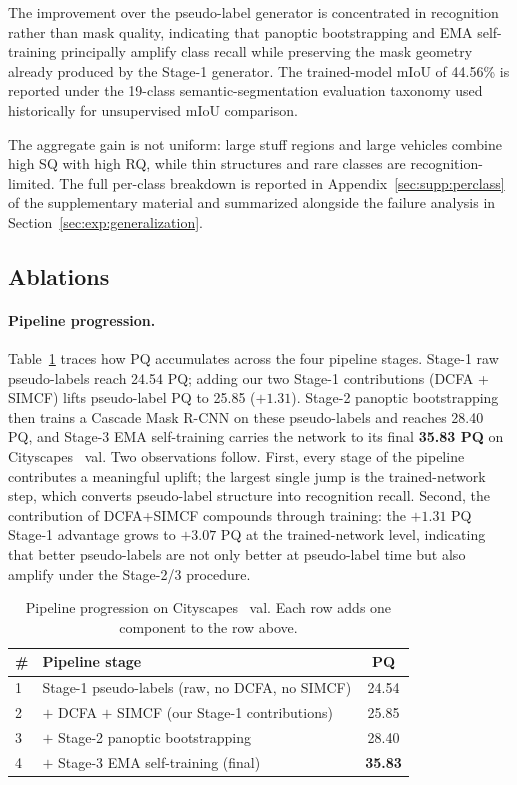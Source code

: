 \documentclass{article}
\begin{document}
The improvement over the pseudo-label generator is concentrated in recognition rather than mask quality, indicating that panoptic bootstrapping and EMA self-training principally amplify class recall while preserving the mask geometry already produced by the Stage-1 generator. The trained-model mIoU of 44.56\% is reported under the 19-class semantic-segmentation evaluation taxonomy used historically for unsupervised mIoU comparison.

The aggregate gain is not uniform: large stuff regions and large vehicles combine high SQ with high RQ, while thin structures and rare classes are recognition-limited. The full per-class breakdown is reported in Appendix~\ref{sec:supp:perclass} of the supplementary material and summarized alongside the failure analysis in Section~\ref{sec:exp:generalization}.

\subsection{Ablations}
\label{sec:exp:ablations}

\paragraph{Pipeline progression.}
Table~\ref{tab:progression} traces how PQ accumulates across the four pipeline stages. Stage-1 raw pseudo-labels reach 24.54 PQ; adding our two Stage-1 contributions (DCFA + SIMCF) lifts pseudo-label PQ to 25.85 ($+1.31$). Stage-2 panoptic bootstrapping then trains a Cascade Mask R-CNN on these pseudo-labels and reaches 28.40 PQ, and Stage-3 EMA self-training carries the network to its final \textbf{35.83 PQ} on Cityscapes~\cite{cordts2016cityscapes} val. Two observations follow. First, every stage of the pipeline contributes a meaningful uplift; the largest single jump is the trained-network step, which converts pseudo-label structure into recognition recall. Second, the contribution of DCFA+SIMCF compounds through training: the $+1.31$ PQ Stage-1 advantage grows to $+3.07$ PQ at the trained-network level, indicating that better pseudo-labels are not only better at pseudo-label time but also amplify under the Stage-2/3 procedure.

\begin{table}[tbp]
\caption{Pipeline progression on Cityscapes~\cite{cordts2016cityscapes} val. Each row adds one component to the row above.}
\label{tab:progression}
\centering
\small
\setlength{\tabcolsep}{3pt}
\begin{tabular}{l l c}
\toprule
\# & Pipeline stage & PQ \\
\midrule
1 & Stage-1 pseudo-labels (raw, no DCFA, no SIMCF) & 24.54 \\
2 & \quad $+$ DCFA $+$ SIMCF (our Stage-1 contributions) & 25.85 \\
3 & \quad $+$ Stage-2 panoptic bootstrapping & 28.40 \\
4 & \quad $+$ Stage-3 EMA self-training (final) & \textbf{35.83} \\
\bottomrule
\end{tabular}
\end{table}
\end{document}
